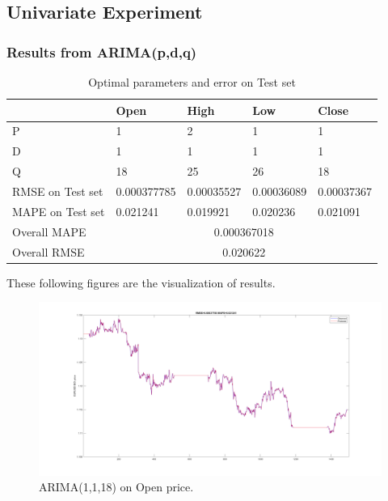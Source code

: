 \documentclass[11pt]{article}
\begin{document}
\subsection{Univariate Experiment}
\subsubsection{Results from ARIMA(p,d,q)}

\begin{table}[H]
\begin{tabular}{|l|l|l|l|l|}
  \hline
  & Open        & High       & Low        & Close      \\ \hline
  P                & 1           & 2          & 1          & 1          \\ \hline
  D                & 1           & 1          & 1          & 1          \\ \hline
  Q                & 18          & 25         & 26         & 18         \\ \hline
  RMSE on Test set & 0.000377785 & 0.00035527 & 0.00036089 & 0.00037367 \\ \hline
  MAPE on Test set & 0.021241    & 0.019921   & 0.020236   & 0.021091   \\ \hline
  Overall MAPE     & \multicolumn{4}{c|}{0.000367018}                   \\ \hline
  Overall RMSE     & \multicolumn{4}{c|}{0.020622}                      \\ \hline
\end{tabular}
\caption{Optimal parameters and error on Test set}
\end{table}
These following figures are the visualization of results.
\begin{figure}[H]
  \centering
  \includegraphics[width=\textwidth,keepaspectratio]{figs/arima_1_1_18_open.png}
  \caption{ARIMA(1,1,18) on Open price.}
\end{figure}
\end{document}
